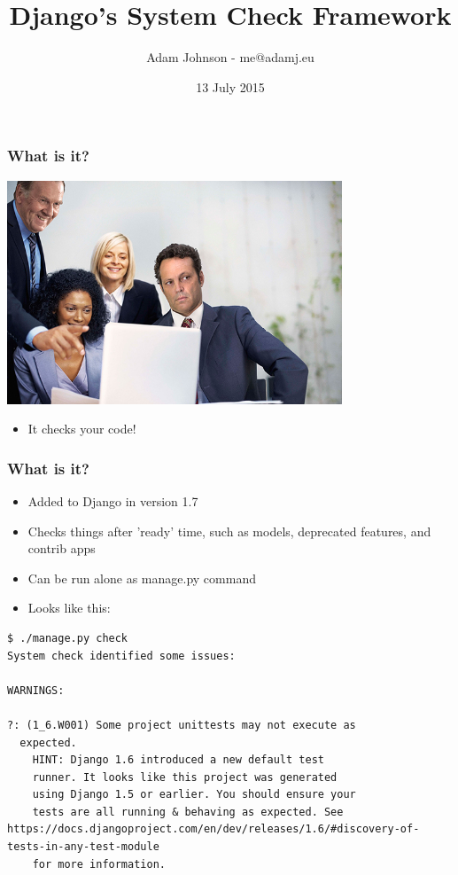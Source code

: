\documentclass{beamer}
\title{Django's System Check Framework}
\author{Adam Johnson - me@adamj.eu}
\date{13 July 2015}
\begin{document}
\maketitle


\begin{frame}[fragile]\frametitle{What is it?}

    \begin{center}
        \includegraphics[width=10cm]{checkit}
    \end{center}

    \begin{itemize}
        \item It checks your code!
    \end{itemize}

\end{frame}


\begin{frame}[fragile]\frametitle{What is it?}

    \begin{itemize}
        \item Added to Django in version 1.7
        \item Checks things after 'ready' time, such as models, deprecated features, and contrib apps
        \item Can be run alone as manage.py command
        \item Looks like this:
    \end{itemize}

        \begin{lstlisting}
$ ./manage.py check
System check identified some issues:

WARNINGS:

?: (1_6.W001) Some project unittests may not execute as
  expected.
    HINT: Django 1.6 introduced a new default test
    runner. It looks like this project was generated
    using Django 1.5 or earlier. You should ensure your
    tests are all running & behaving as expected. See https://docs.djangoproject.com/en/dev/releases/1.6/#discovery-of-tests-in-any-test-module
    for more information.
    \end{lstlisting}

\end{frame}
\end{document}
